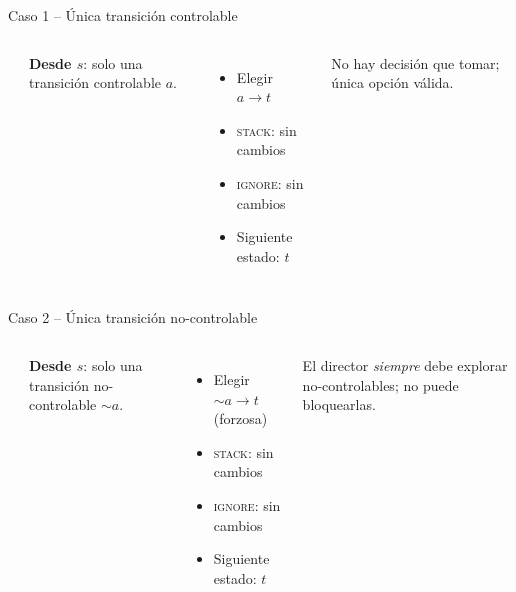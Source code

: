 \documentclass{beamer}
\begin{document}
\begin{frame}{Caso 1 -- \'Unica transici\'on controlable}
\begin{columns}[c]
\begin{center}
\end{center}

\textbf{Desde $s$}: solo una transici\'on controlable $a$.

\medskip
\begin{itemize}
  \item[\textcolor{cChosen}{$\blacktriangleright$}] Elegir $a \to t$
  \item \textsc{stack}: sin cambios
  \item \textsc{ignore}: sin cambios
  \item Siguiente estado: $t$
\end{itemize}

\medskip
{\small No hay decisi\'on que tomar; \'unica opci\'on v\'alida.}
\end{columns}
\end{frame}

\begin{frame}{Caso 2 -- \'Unica transici\'on no-controlable}
\begin{columns}[c]
\begin{center}
\end{center}

\textbf{Desde $s$}: solo una transici\'on no-controlable ${\sim}a$.

\medskip
\begin{itemize}
  \item[\textcolor{cChosen}{$\blacktriangleright$}] Elegir ${\sim}a \to t$ (forzosa)
  \item \textsc{stack}: sin cambios
  \item \textsc{ignore}: sin cambios
  \item Siguiente estado: $t$
\end{itemize}

\medskip
{\small El director \emph{siempre} debe explorar no-controlables; no puede bloquearlas.}
\end{columns}
\end{frame}
\end{document}
